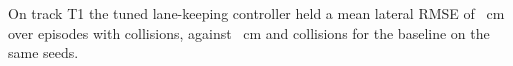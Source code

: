 On track T1 the tuned lane-keeping controller held a mean lateral RMSE of
~cm over  episodes with  collisions,
against ~cm and  collisions for the baseline
on the same seeds.
